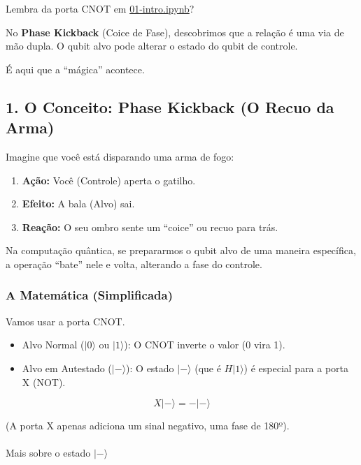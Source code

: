 \documentclass[
  brazilian,
]{report}
\makeatletter
\let\oldparagraph\paragraph
\renewcommand{\paragraph}{
    \@ifstar
      \xxxParagraphStar
      \xxxParagraphNoStar
  }
\newcommand{\xxxParagraphStar}[1]{\oldparagraph*{#1}\mbox{}}
\newcommand{\xxxParagraphNoStar}[1]{\oldparagraph{#1}\mbox{}}
\providecommand{\tightlist}{%
  \setlength{\itemsep}{0pt}\setlength{\parskip}{0pt}}
\makeatother
\begin{document}
Lembra da porta CNOT em \url{01-intro.ipynb}?

No \textbf{Phase Kickback} (Coice de Fase), descobrimos que a relação é
uma via de mão dupla. O qubit alvo pode alterar o estado do qubit de
controle.

É aqui que a ``mágica'' acontece.

\subsection{1. O Conceito: Phase Kickback (O Recuo da
Arma)}\label{o-conceito-phase-kickback-o-recuo-da-arma}

Imagine que você está disparando uma arma de fogo:

\begin{enumerate}
\def\labelenumi{\arabic{enumi}.}
\tightlist
\item
  \textbf{Ação:} Você (Controle) aperta o gatilho.
\item
  \textbf{Efeito:} A bala (Alvo) sai.
\item
  \textbf{Reação:} O seu ombro sente um ``coice'' ou recuo para trás.
\end{enumerate}

Na computação quântica, se prepararmos o qubit alvo de uma maneira
específica, a operação ``bate'' nele e volta, alterando a fase do
controle.

\subsubsection{A Matemática
(Simplificada)}\label{a-matemuxe1tica-simplificada}

Vamos usar a porta CNOT.

\begin{itemize}
\tightlist
\item
  Alvo Normal (\(|0\rangle\) ou \(|1\rangle\)): O CNOT inverte o valor
  (0 vira 1).
\item
  Alvo em Autestado (\(|-\rangle\)): O estado \(|-\rangle\) (que é
  \(H|1\rangle\)) é especial para a porta X (NOT).
\end{itemize}

\[X|-\rangle = -|-\rangle\]

(A porta X apenas adiciona um sinal negativo, uma fase de 180º).

\paragraph{\texorpdfstring{Mais sobre o estado
\(|-\rangle\)}{Mais sobre o estado \textbar-\textbackslash rangle}}\label{mais-sobre-o-estado--rangle}
\end{document}
